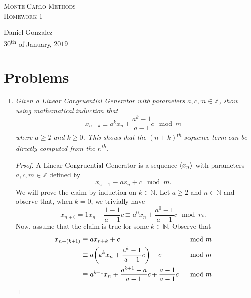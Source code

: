 \documentclass{article}
\renewcommand{\geq}{\geqslant}
\DeclarePairedDelimiter \seq{\langle}{\rangle}
\DeclarePairedDelimiter \parens{(}{)}
\begin{document}
\begin{center}
	\textsc{\huge Monte Carlo Methods}\\
	\textsc{\Large Homework 1}\\
\end{center}
\begin{flushright}
	Daniel Gonzalez\\
    $30$\textsuperscript{th} of January, $2019$
\end{flushright}

\section{Problems}
\begin{enumerate}
    \item
        {\it Given a Linear Congruential Generator with parameters $a, c, m \in \mathbb{Z}$, show using mathematical induction that
        \begin{equation*}
            x_{n+k} \equiv a^k x_n + \frac{a^k - 1}{a-1}c \mod{m}
        \end{equation*}
        where $a \geq 2$ and $k \geq 0$.
        This shows that the $(n+k)$\textsuperscript{th} sequence term can be directly computed from the $n$\textsuperscript{th}.}
        \begin{proof}
            A Linear Congruential Generator is a sequence $\seq{x_n}$ with parameters $a, c, m \in \mathbb{Z}$ defined by
            \begin{equation*}
                x_{n+1} \equiv ax_n + c \mod{m}.
            \end{equation*}
            We will prove the claim by induction on $k \in \mathbb{N}$.
            Let $a \geq 2$ and $n \in \mathbb{N}$ and observe that, when $k = 0$, we trivially have
            \begin{equation*}
                x_{n + 0} = 1x_n + \frac{1 - 1}{a - 1}c \equiv a^0x_n + \frac{a^0 - 1}{a - 1}c \mod{m}.
            \end{equation*}
            Now, assume that the claim is true for some $k \in \mathbb{N}$.
            Observe that
            \begin{alignat*}{2}
                x_{n + (k+1)} &\equiv ax_{n + k} + c &&\mod{m}\\
                &\equiv a\parens*{a^kx_{n} + \frac{a^k - 1}{a - 1}c} + c &&\mod{m}\\
                &\equiv a^{k+1}x_n + \frac{a^{k+1} - a}{a - 1}c + \frac{a - 1}{a - 1}c &&\mod{m}\\

\end{alignat*}
\end{proof}
\end{enumerate}
\end{document}
